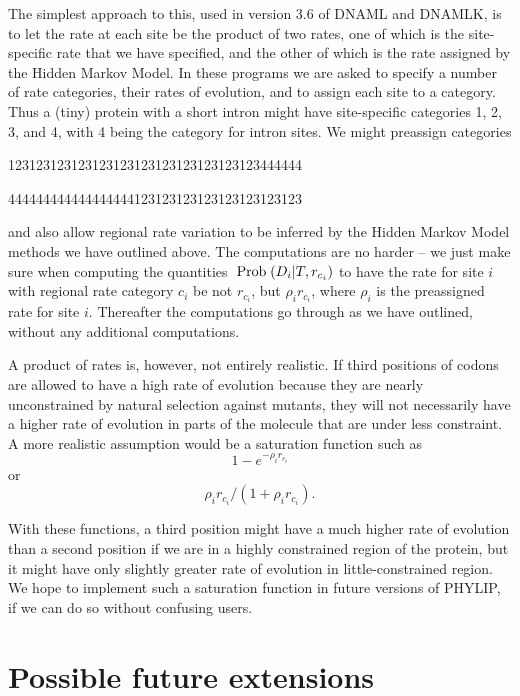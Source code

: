 \documentclass[12pt]{article}
\begin{document}
The simplest approach to this, used in version 3.6 of DNAML and DNAMLK, is to
let the rate at each site be the product of two rates, one of which is the
site-specific rate that we have specified, and the other of which is the
rate assigned by the Hidden Markov Model.
In these programs we are asked to specify a number of rate categories,
their rates of evolution, and to assign each site to a category.  Thus a
(tiny) protein with a short intron might have site-specific categories 1, 2, 3, and 4,
with 4 being the category for intron sites.  We might preassign
categories
\medskip

\centerline{123123123123123123123123123123123123444444}
\centerline{444444444444444444123123123123123123123123}
\medskip

and also allow regional rate variation to be inferred by the Hidden Markov
Model methods we have outlined above.  The computations are no harder -- we
just make sure when computing the quantities ${\rm\;Prob\;}(D_i|T, r_{c_i})$ to
have the rate for site $i$ with regional rate category $c_i$ be not $r_{c_i}$,
but $\rho_i r_{c_i}$, where $\rho_i$ is the preassigned rate for site $i$.
Thereafter the computations go through as we have
outlined, without any additional computations.

A product of rates is, however, not entirely realistic.  If third positions
of codons are allowed to have a high rate of evolution because they are
nearly unconstrained by natural selection against mutants, they will not
necessarily have a higher rate of evolution in parts of the molecule that
are under less constraint.  A more realistic assumption would be a saturation
function such as
\begin{equation} %
1 - e^{-\rho_i r_{c_i}}
\end{equation}
\noindent
or
\begin{equation} %
\rho_i r_{c_i} \bigg/ \left(1 + \rho_i r_{c_i} \right).
\end{equation}

With these functions, a third position might have a much higher rate of
evolution than a second position if we are in a highly constrained
region of the protein, but it might have only slightly greater rate of
evolution in little-constrained region.  We hope to implement such a saturation
function in future versions of PHYLIP, if we can do so without confusing users.


\section*{Possible future extensions}
\end{document}
